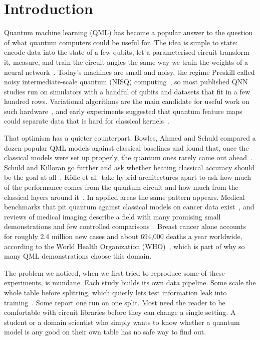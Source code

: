 \documentclass[conference]{IEEEtran}
\begin{document}
\section{Introduction}
Quantum machine learning (QML) has become a popular answer to the question of what quantum computers could be useful for. The idea is simple to state: encode data into the state of a few qubits, let a parameterised circuit transform it, measure, and train the circuit angles the same way we train the weights of a neural network~\cite{schuld2020circuit}. Today's machines are small and noisy, the regime Preskill called noisy intermediate-scale quantum (NISQ) computing~\cite{preskill2018nisq}, so most published QNN studies run on simulators with a handful of qubits and datasets that fit in a few hundred rows. Variational algorithms are the main candidate for useful work on such hardware~\cite{cerezo2021variational}, and early experiments suggested that quantum feature maps could separate data that is hard for classical kernels~\cite{havlicek2019supervised}.

That optimism has a quieter counterpart. Bowles, Ahmed and Schuld compared a dozen popular QML models against classical baselines and found that, once the classical models were set up properly, the quantum ones rarely came out ahead~\cite{bowles2024better}. Schuld and Killoran go further and ask whether beating classical accuracy should be the goal at all~\cite{schuld2022advantage}. K\"olle et al.\ take hybrid architectures apart to ask how much of the performance comes from the quantum circuit and how much from the classical layers around it~\cite{kolle2023disentangling}. In applied areas the same pattern appears. Medical benchmarks that pit quantum against classical models on cancer data exist~\cite{leither2026oncology}, and reviews of medical imaging describe a field with many promising small demonstrations and few controlled comparisons~\cite{shahriyar2025medical}. Breast cancer alone accounts for roughly 2.4 million new cases and about 694,000 deaths a year worldwide, according to the World Health Organization (WHO)~\cite{who2024breast}, which is part of why so many QML demonstrations choose this domain.

The problem we noticed, when we first tried to reproduce some of these experiments, is mundane. Each study builds its own data pipeline. Some scale the whole table before splitting, which quietly lets test information leak into training~\cite{kaufman2012leakage}. Some report one run on one split. Most need the reader to be comfortable with circuit libraries before they can change a single setting. A student or a domain scientist who simply wants to know whether a quantum model is any good on their own table has no safe way to find out.
\end{document}
